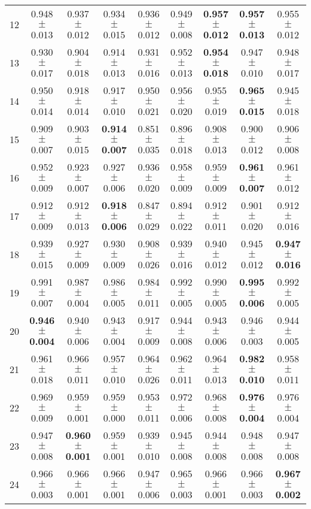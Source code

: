 \begin{table}[!ht]
{\begin{tabular}{r c c c c c c c c}
12 & 0.948 $\pm$ 0.013 & 0.937 $\pm$ 0.012 & 0.934 $\pm$ 0.015 & 0.936 $\pm$ 0.012 & 0.949 $\pm$ 0.008 & \textbf{0.957 $\pm$ 0.012} & \textbf{0.957 $\pm$ 0.013} & 0.955 $\pm$ 0.012 \\
13 & 0.930 $\pm$ 0.017 & 0.904 $\pm$ 0.018 & 0.914 $\pm$ 0.013 & 0.931 $\pm$ 0.016 & 0.952 $\pm$ 0.013 & \textbf{0.954 $\pm$ 0.018} & 0.947 $\pm$ 0.010 & 0.948 $\pm$ 0.017 \\
14 & 0.950 $\pm$ 0.014 & 0.918 $\pm$ 0.014 & 0.917 $\pm$ 0.010 & 0.950 $\pm$ 0.021 & 0.956 $\pm$ 0.020 & 0.955 $\pm$ 0.019 & \textbf{0.965 $\pm$ 0.015} & 0.945 $\pm$ 0.018 \\
15 & 0.909 $\pm$ 0.007 & 0.903 $\pm$ 0.015 & \textbf{0.914 $\pm$ 0.007} & 0.851 $\pm$ 0.035 & 0.896 $\pm$ 0.018 & 0.908 $\pm$ 0.013 & 0.900 $\pm$ 0.012 & 0.906 $\pm$ 0.008 \\
16 & 0.952 $\pm$ 0.009 & 0.923 $\pm$ 0.007 & 0.927 $\pm$ 0.006 & 0.936 $\pm$ 0.020 & 0.958 $\pm$ 0.009 & 0.959 $\pm$ 0.009 & \textbf{0.961 $\pm$ 0.007} & 0.961 $\pm$ 0.012 \\
17 & 0.912 $\pm$ 0.009 & 0.912 $\pm$ 0.013 & \textbf{0.918 $\pm$ 0.006} & 0.847 $\pm$ 0.029 & 0.894 $\pm$ 0.022 & 0.912 $\pm$ 0.011 & 0.901 $\pm$ 0.020 & 0.912 $\pm$ 0.016 \\
18 & 0.939 $\pm$ 0.015 & 0.927 $\pm$ 0.009 & 0.930 $\pm$ 0.009 & 0.908 $\pm$ 0.026 & 0.939 $\pm$ 0.016 & 0.940 $\pm$ 0.012 & 0.945 $\pm$ 0.012 & \textbf{0.947 $\pm$ 0.016} \\
19 & 0.991 $\pm$ 0.007 & 0.987 $\pm$ 0.004 & 0.986 $\pm$ 0.005 & 0.984 $\pm$ 0.011 & 0.992 $\pm$ 0.005 & 0.990 $\pm$ 0.005 & \textbf{0.995 $\pm$ 0.006} & 0.992 $\pm$ 0.005 \\
20 & \textbf{0.946 $\pm$ 0.004} & 0.940 $\pm$ 0.006 & 0.943 $\pm$ 0.004 & 0.917 $\pm$ 0.009 & 0.944 $\pm$ 0.008 & 0.943 $\pm$ 0.006 & 0.946 $\pm$ 0.003 & 0.944 $\pm$ 0.005 \\
21 & 0.961 $\pm$ 0.018 & 0.966 $\pm$ 0.011 & 0.957 $\pm$ 0.010 & 0.964 $\pm$ 0.026 & 0.962 $\pm$ 0.011 & 0.964 $\pm$ 0.013 & \textbf{0.982 $\pm$ 0.010} & 0.958 $\pm$ 0.011 \\
22 & 0.969 $\pm$ 0.009 & 0.959 $\pm$ 0.001 & 0.959 $\pm$ 0.000 & 0.953 $\pm$ 0.011 & 0.972 $\pm$ 0.006 & 0.968 $\pm$ 0.008 & \textbf{0.976 $\pm$ 0.004} & 0.976 $\pm$ 0.004 \\
23 & 0.947 $\pm$ 0.008 & \textbf{0.960 $\pm$ 0.001} & 0.959 $\pm$ 0.001 & 0.939 $\pm$ 0.010 & 0.945 $\pm$ 0.008 & 0.944 $\pm$ 0.008 & 0.948 $\pm$ 0.008 & 0.947 $\pm$ 0.008 \\
24 & 0.966 $\pm$ 0.003 & 0.966 $\pm$ 0.001 & 0.966 $\pm$ 0.001 & 0.947 $\pm$ 0.006 & 0.965 $\pm$ 0.003 & 0.966 $\pm$ 0.001 & 0.966 $\pm$ 0.003 & \textbf{0.967 $\pm$ 0.002} \\

\end{tabular}}
\end{table}
